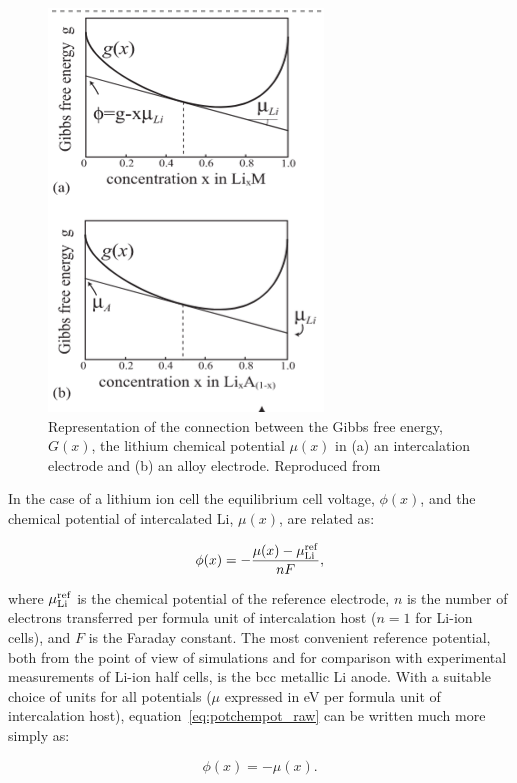 \documentclass[../main.tex]{subfiles}
\begin{document}
\begin{figure}
    \centering
    \includegraphics[scale=2]{figures/thermodynamics_vanderven.png}
    \caption{Representation of the connection between the Gibbs free energy, $G(x)$, the  lithium chemical potential $\mu(x)$ in (a) an intercalation electrode and (b) an alloy electrode. Reproduced from \cite{VanderVen2020}}
    \label{fig:vanderven_thermodynamics}
\end{figure}

In the case of a lithium ion cell the equilibrium cell voltage, $\phi(x)$, and the chemical potential of intercalated Li, $\mu(x)$, are related as:

\begin{equation}
    \phi(x) = -\frac{\mu(x) - \mu_{\rm{Li}}^{\rm{ref}}}{nF},
    \label{eq:potchempot_raw}
\end{equation}

where $\mu_{\rm{Li}}^{\rm{ref}}$ is the chemical potential of the reference electrode, $n$ is the number of electrons transferred per formula unit of intercalation host ($n =1$ for Li-ion cells), and $F$ is the Faraday constant. The most convenient reference potential, both from the point of view of simulations and for comparison with experimental measurements of Li-ion half cells, is the bcc metallic Li anode. With a suitable choice of units for all potentials ($\mu$ expressed in eV per formula unit of intercalation host), equation~\ref{eq:potchempot_raw} can be written much more simply as: \cite{CEDER1999131}

\begin{equation}
    \phi(x) = -\mu(x).
    \label{eq:potchempot}
\end{equation}
\end{document}
